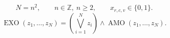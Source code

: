 \begin{equation}
  N=n^2,\qquad n\in\mathbb{Z},\ n\geq 2,\qquad
  x_{r,c,v}\in\{0,1\}.
\end{equation}
\begin{equation}
  \operatorname{EXO}(z_1,\ldots,z_N)
  =\left(\bigvee_{i=1}^{N}z_i\right)
   \land\operatorname{AMO}(z_1,\ldots,z_N).
\end{equation}
